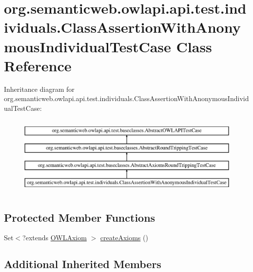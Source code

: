 \hypertarget{classorg_1_1semanticweb_1_1owlapi_1_1api_1_1test_1_1individuals_1_1_class_assertion_with_anonymous_individual_test_case}{\section{org.\-semanticweb.\-owlapi.\-api.\-test.\-individuals.\-Class\-Assertion\-With\-Anonymous\-Individual\-Test\-Case Class Reference}
\label{classorg_1_1semanticweb_1_1owlapi_1_1api_1_1test_1_1individuals_1_1_class_assertion_with_anonymous_individual_test_case}
}
Inheritance diagram for org.\-semanticweb.\-owlapi.\-api.\-test.\-individuals.\-Class\-Assertion\-With\-Anonymous\-Individual\-Test\-Case\-:\begin{figure}[H]
\begin{center}
\leavevmode
\includegraphics[height=4.000000cm]{classorg_1_1semanticweb_1_1owlapi_1_1api_1_1test_1_1individuals_1_1_class_assertion_with_anonymous_individual_test_case}
\end{center}
\end{figure}
\subsection*{Protected Member Functions}
\begin{DoxyCompactItemize}
\item 
Set$<$?extends \hyperlink{interfaceorg_1_1semanticweb_1_1owlapi_1_1model_1_1_o_w_l_axiom}{O\-W\-L\-Axiom} $>$ \hyperlink{classorg_1_1semanticweb_1_1owlapi_1_1api_1_1test_1_1individuals_1_1_class_assertion_with_anonymous_individual_test_case_ae55582e130dea46eec23bb6c2b4f64bf}{create\-Axioms} ()
\end{DoxyCompactItemize}
\subsection*{Additional Inherited Members}


